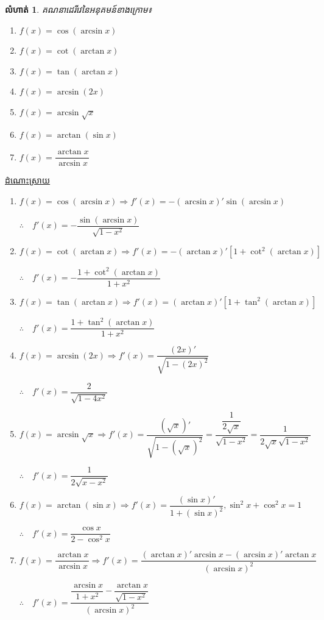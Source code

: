 \documentclass[12pt,fleqn]{book} %
\newtheorem{exercise}{\kml លំហាត់}
\newcommand{\answer}{\begin{center}
\kml \color{blue} \underline{ដំណោះស្រាយ}
\end{center}}
\begin{document}
\begin{exercise}
គណនាដេរីវេនៃអនុគមន៍ខាងក្រោម៖
\begin{multicols}{2}
\begin{enumerate}
\item $f(x)=\cos (\arcsin x)$
\item $f(x)=\cot (\arctan x)$
\item $f(x)=\tan (\arctan x)$
\item $f(x)=\arcsin (2x)$
\item $f(x)=\arcsin \sqrt{x}$
\item $f(x)=\arctan (\sin x)$
\item $f(x)=\dfrac{\arctan x}{\arcsin x}$
\end{enumerate}
\end{multicols}
\end{exercise}
\answer 
\begin{enumerate}
\item $f(x)=\cos (\arcsin x)\Longrightarrow f'(x)=-(\arcsin x)'\sin (\arcsin x)$
\begin{center}
$\therefore \quad f'(x)=-\dfrac{\sin (\arcsin x)}{\sqrt{1-x^2}}$
\end{center}
\item $f(x)=\cot (\arctan x)\Longrightarrow f'(x)=-(\arctan x)'[1+\cot^2 (\arctan x)]$
\begin{center}
$\therefore \quad f'(x)=-\dfrac{1+\cot^2 (\arctan x)}{1+x^2}$
\end{center}
\item $f(x)=\tan (\arctan x)\Longrightarrow f'(x)=(\arctan x)'[1+\tan^2 (\arctan x)]$
\begin{center}
$\therefore \quad f'(x)=\dfrac{1+\tan^2 (\arctan x)}{1+x^2}$
\end{center}
\item $f(x)=\arcsin (2x)\Longrightarrow f'(x)=\dfrac{(2x)'}{\sqrt{1-(2x)^2}}$
\begin{center}
$\therefore \quad f'(x)=\dfrac{2}{\sqrt{1-4x^2}}$
\end{center}
\item $f(x)=\arcsin \sqrt{x}\Longrightarrow f'(x)=\dfrac{(\sqrt{x})'}{\sqrt{1-(\sqrt{x})^2}}=\dfrac{\dfrac{1}{2\sqrt{x}}}{\sqrt{1-x^2}}=\dfrac{1}{2\sqrt{x}\sqrt{1-x^2}}$
\begin{center}
$\therefore \quad f'(x)=\dfrac{1}{2\sqrt{x-x^2}}$
\end{center}
\item $f(x)=\arctan (\sin x)\Longrightarrow f'(x)=\dfrac{(\sin x)'}{1+(\sin x)^2},\sin^2 x+\cos^2 x=1$
\begin{center}
$\therefore \quad f'(x)=\dfrac{\cos x}{2-\cos^2 x}$
\end{center}
\item $f(x)=\dfrac{\arctan x}{\arcsin x}\Longrightarrow f'(x)=\dfrac{(\arctan x)'\arcsin x-(\arcsin x)'\arctan x}{(\arcsin x)^2}$
\begin{center}
$\therefore \quad f'(x)=\dfrac{\dfrac{\arcsin x}{1+x^2}-\dfrac{\arctan x}{\sqrt{1-x^2}}}{(\arcsin x)^2}$
\end{center}
\end{enumerate}
\end{document}
